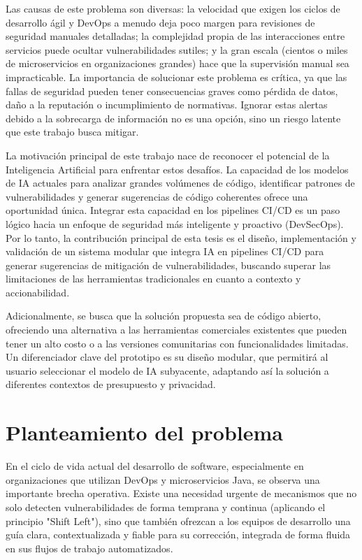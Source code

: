 Las causas de este problema son diversas: la velocidad que exigen los ciclos de desarrollo ágil y DevOps a menudo deja poco margen para revisiones de seguridad manuales detalladas; la complejidad propia de las interacciones entre servicios puede ocultar vulnerabilidades sutiles; y la gran escala (cientos o miles de microservicios en organizaciones grandes) hace que la supervisión manual sea impracticable. La importancia de solucionar este problema es crítica, ya que las fallas de seguridad pueden tener consecuencias graves como pérdida de datos, daño a la reputación o incumplimiento de normativas. Ignorar estas alertas debido a la sobrecarga de información no es una opción, sino un riesgo latente que este trabajo busca mitigar.

La motivación principal de este trabajo nace de reconocer el potencial de la Inteligencia Artificial para enfrentar estos desafíos. La capacidad de los modelos de IA actuales para analizar grandes volúmenes de código, identificar patrones de vulnerabilidades y generar sugerencias de código coherentes ofrece una oportunidad única. Integrar esta capacidad en los pipelines CI/CD es un paso lógico hacia un enfoque de seguridad más inteligente y proactivo (DevSecOps). Por lo tanto, la contribución principal de esta tesis es el diseño, implementación y validación de un sistema modular que integra IA en pipelines CI/CD para generar sugerencias de mitigación de vulnerabilidades, buscando superar las limitaciones de las herramientas tradicionales en cuanto a contexto y accionabilidad.

Adicionalmente, se busca que la solución propuesta sea de código abierto, ofreciendo una alternativa a las herramientas comerciales existentes que pueden tener un alto costo \cite{ghas_docs, sonarqube_editions} o a las versiones comunitarias con funcionalidades limitadas. Un diferenciador clave del prototipo es su diseño modular, que permitirá al usuario seleccionar el modelo de IA subyacente, adaptando así la solución a diferentes contextos de presupuesto y privacidad.

\section{Planteamiento del problema}\label{sec:planteamiento_problema}

En el ciclo de vida actual del desarrollo de software, especialmente en organizaciones que utilizan DevOps y microservicios Java, se observa una importante brecha operativa. Existe una necesidad urgente de mecanismos que no solo detecten vulnerabilidades de forma temprana y continua (aplicando el principio "Shift Left"), sino que también ofrezcan a los equipos de desarrollo una guía clara, contextualizada y fiable para su corrección, integrada de forma fluida en sus flujos de trabajo automatizados.

